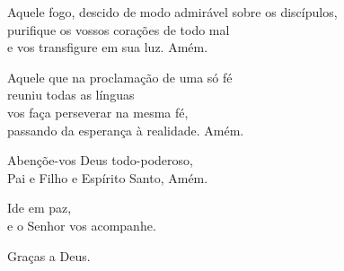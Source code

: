 \documentclass{book}
\begin{document}
\begin{flushleft}
    Aquele fogo, descido de modo admirável sobre os discípulos, \\
    purifique os vossos corações de todo mal \\
    e vos transfigure em sua luz.
    Amém.

    Aquele que na proclamação de uma só fé \\
    reuniu todas as línguas \\
    vos faça perseverar na mesma fé, \\
    passando da esperança à realidade.
    Amém.

    Abençõe-vos Deus todo-poderoso, \\
    Pai e Filho e Espírito Santo,
    Amém.

    Ide em paz, \\
    e o Senhor vos acompanhe.

    Graças a Deus.

\end{flushleft}
\end{document}
